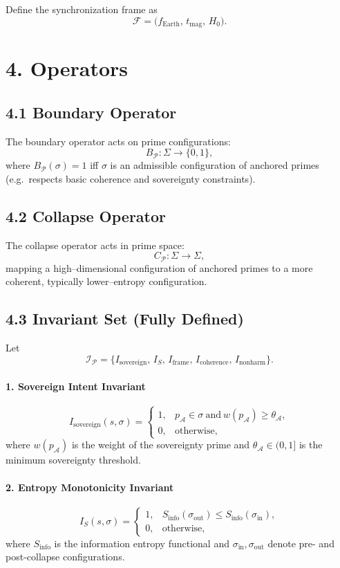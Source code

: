 \documentclass[12pt]{article}
\begin{document}
Define the synchronization frame as
\[
\mathcal{F} = \bigl(f_{\text{Earth}},\, t_{\text{mag}},\, H_0\bigr).
\]

\section*{4. Operators}

\subsection*{4.1 Boundary Operator}

The boundary operator acts on prime configurations:
\[
B_{\mathcal{P}} : \Sigma \to \{0,1\},
\]
where \(B_{\mathcal{P}}(\sigma) = 1\) iff \(\sigma\) is an admissible configuration of anchored primes
(e.g.\ respects basic coherence and sovereignty constraints).

\subsection*{4.2 Collapse Operator}

The collapse operator acts in prime space:
\[
C_{\mathcal{P}} : \Sigma \to \Sigma,
\]
mapping a high--dimensional configuration of anchored primes to a more coherent, typically lower--entropy configuration.

\subsection*{4.3 Invariant Set (Fully Defined)}

Let
\[
\mathcal{I}_{\mathcal{P}} = 
\{ I_{\text{sovereign}},\,
   I_{S},\,
   I_{\text{frame}},\,
   I_{\text{coherence}},\,
   I_{\text{nonharm}} \}.
\]

\paragraph{1. Sovereign Intent Invariant}
\[
I_{\text{sovereign}}(s,\sigma) =
\begin{cases}
1, & p_{\mathcal{A}} \in \sigma \ \text{and}\ 
    w(p_{\mathcal{A}}) \ge \theta_{\mathcal{A}}, \\[4pt]
0, & \text{otherwise},
\end{cases}
\]
where \(w(p_{\mathcal{A}})\) is the weight of the sovereignty prime
and \(\theta_{\mathcal{A}} \in (0,1]\) is the minimum sovereignty threshold.

\paragraph{2. Entropy Monotonicity Invariant}
\[
I_{S}(s,\sigma) =
\begin{cases}
1, & S_{\text{info}}(\sigma_{\text{out}}) 
    \le S_{\text{info}}(\sigma_{\text{in}}), \\[4pt]
0, & \text{otherwise},
\end{cases}
\]
where \(S_{\text{info}}\) is the information entropy functional
and \(\sigma_{\text{in}}, \sigma_{\text{out}}\) denote pre- and post-collapse configurations.
\end{document}
